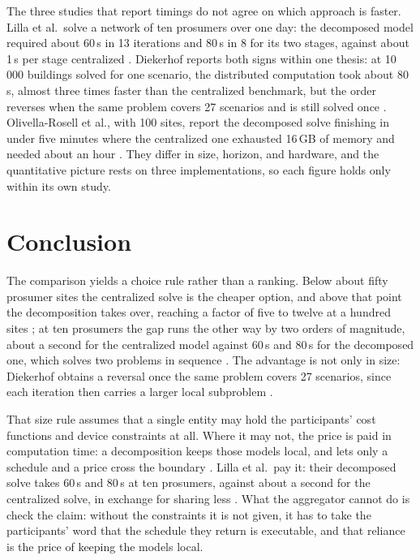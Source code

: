 \documentclass[conference]{IEEEtran}
\begin{document}
The three studies that report timings do not agree on which approach is faster. Lilla et al.\ solve a network of ten prosumers over one day: the decomposed model required about 60\,s in 13 iterations and 80\,s in 8 for its two stages, against about 1\,s per stage centralized \cite{Lilla2020}. Diekerhof reports both signs within one thesis: at 10\,000 buildings solved for one scenario, the distributed computation took about 80\,s, almost three times faster than the centralized benchmark, but the order reverses when the same problem covers 27 scenarios and is still solved once \cite{Diekerhof2018}. Olivella-Rosell et al., with 100 sites, report the decomposed solve finishing in under five minutes where the centralized one exhausted 16\,GB of memory and needed about an hour \cite{OlivellaRosell2020}. They differ in size, horizon, and hardware, and the quantitative picture rests on three implementations, so each figure holds only within its own study.


\section{Conclusion}

The comparison yields a choice rule rather than a ranking. Below about fifty prosumer sites the centralized solve is the cheaper option, and above that point the decomposition takes over, reaching a factor of five to twelve at a hundred sites \cite{OlivellaRosell2020}; at ten prosumers the gap runs the other way by two orders of magnitude, about a second for the centralized model against 60\,s and 80\,s for the decomposed one, which solves two problems in sequence \cite{Lilla2020}. The advantage is not only in size: Diekerhof obtains a reversal once the same problem covers 27 scenarios, since each iteration then carries a larger local subproblem \cite{Diekerhof2018}.

That size rule assumes that a single entity may hold the participants' cost functions and device constraints at all. Where it may not, the price is paid in computation time: a decomposition keeps those models local, and lets only a schedule and a price cross the boundary \cite{Molzahn2017}. Lilla et al.\ pay it: their decomposed solve takes 60\,s and 80\,s at ten prosumers, against about a second for the centralized solve, in exchange for sharing less \cite{Lilla2020}. What the aggregator cannot do is check the claim: without the constraints it is not given, it has to take the participants' word that the schedule they return is executable, and that reliance is the price of keeping the models local.
\end{document}
